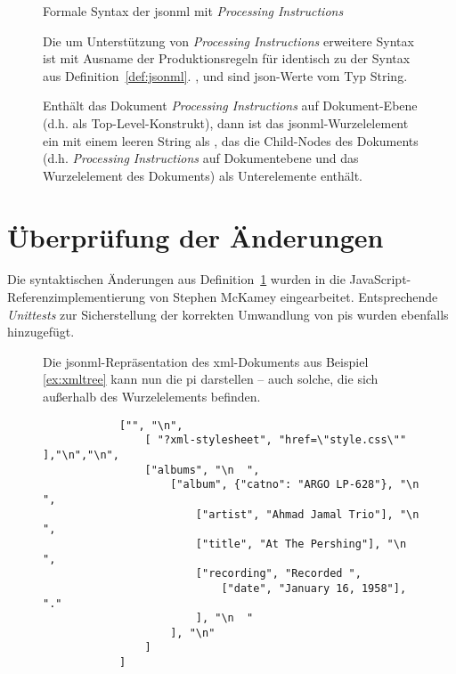 \begin{figure}[h]
    \begin{definition} Formale Syntax der \acrfull{jsonml} mit \emph{Processing Instructions}
        \label{def:jsonmlpi}

        Die um Unterstützung von \emph{Processing Instructions} erweitere Syntax ist mit Ausname der Produktionsregeln für  identisch zu der Syntax aus Definition~\ref{def:jsonml}.
        ,  und  sind \acrshort{json}-Werte vom Typ String.

        \begin{grammar}
            
        \end{grammar}

        Enthält das Dokument \emph{Processing Instructions} auf Dokument-Ebene (d.h. als Top-Level-Konstrukt), dann ist das \acrshort{jsonml}-Wurzelelement ein  mit einem leeren String als , das die Child-Nodes des Dokuments (d.h. \emph{Processing Instructions} auf Dokumentebene und das Wurzelelement des Dokuments) als Unterelemente enthält.
    \end{definition}
\end{figure}

\section{Überprüfung der Änderungen}

Die syntaktischen Änderungen aus Definition~\ref{def:jsonmlpi} wurden in die JavaScript-Referenz\-implementierung von Stephen McKamey eingearbeitet. Entsprechende \emph{Unittests} zur Sicherstellung der korrekten Umwandlung von \glspl{pi} wurden ebenfalls hinzugefügt.

\begin{figure}[h!]
    \begin{example} Die \acrshort{jsonml}-Repräsentation des \acrshort{xml}-Dokuments aus Beispiel \ref{ex:xmltree} kann nun die \gls{pi} darstellen -- auch solche, die sich außerhalb des Wurzelelements befinden.
        \begin{verbatim}
            ["", "\n",
                [ "?xml-stylesheet", "href=\"style.css\"" ],"\n","\n",
                ["albums", "\n  ",
                    ["album", {"catno": "ARGO LP-628"}, "\n    ",
                        ["artist", "Ahmad Jamal Trio"], "\n    ",
                        ["title", "At The Pershing"], "\n    ",
                        ["recording", "Recorded ",
                            ["date", "January 16, 1958"], "."
                        ], "\n  "
                    ], "\n"
                ]
            ]
        \end{verbatim}
    \end{example}
\end{figure}

